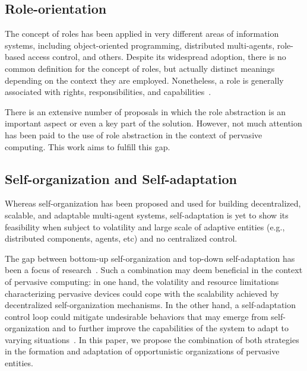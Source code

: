 \subsection{Role-orientation}



The concept of roles has been applied in very different areas of information systems, including object-oriented programming, distributed multi-agents, role-based access control, and others. Despite its widespread adoption, there is no common definition for the concept of roles, but actually distinct meanings depending on the context they are employed. Nonetheless, a role is generally associated with rights, responsibilities, and capabilities~\cite{Roles:Survey}.

There is an extensive number of proposals in which the role abstraction is an important aspect or even a key part of the solution. However, not much attention has been paid to the use of role abstraction in the context of pervasive computing. %
This work aims to fulfill this gap. %


\subsection{Self-organization and Self-adaptation}

Whereas self-organization has been proposed and used for building decentralized, scalable, and adaptable multi-agent systems, self-adaptation is yet to show its feasibility when subject to volatility and large scale of adaptive entities (e.g., distributed components, agents, etc) and no centralized control. 

The gap between bottom-up self-organization and top-down self-adaptation has been a focus of research~\cite{Kramer:, Zambonelli:, Weyns:}. Such a combination may deem beneficial in the context of pervasive computing: in one hand, the volatility and resource limitations characterizing pervasive devices could cope with the scalability achieved by decentralized self-organization mechanisms. In the other hand, a self-adaptation control loop could mitigate undesirable behaviors that may emerge from self-organization and to further improve the capabilities of the system to adapt to varying situations~\cite{Zambonelli:}. In this paper, we propose the combination of both strategies in the formation and adaptation of opportunistic organizations of pervasive entities.

